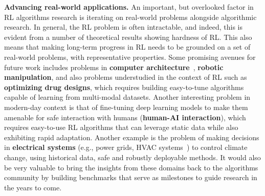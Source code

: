 \documentclass[../thesis.tex]{subfiles}
\begin{document}
{\textbf{Advancing real-world applications.}} An important, but overlooked factor in RL algorithms research is iterating on real-world problems alongside algorithmic research. In general, the RL problem is often intractable, and indeed, this is evident from a number of theoretical results showing hardness of RL. This also means that making long-term progress in RL needs to be grounded on a set of real-world problems, with representative properties. Some promising avenues for future work includes problems in \textbf{computer architecture}~\citep{fawzi2022discovering}, \textbf{robotic manipulation}, and also problems understudied in the context of RL such as \textbf{optimizing drug designs}, which requires building easy-to-tune algorithms capable of learning from multi-modal datasets. 
Another interesting problem in modern-day context is that of fine-tuning deep learning models to make them amenable for safe interaction with humans (\textbf{human-AI interaction}), which requires easy-to-use RL algorithms that can leverage static data while also exhibiting rapid adaptation. Another example is the problem of making decisions in \textbf{electrical systems} (e.g., power grids, HVAC systems~\citep{wong2022optimizing}) to control climate change, using historical data, safe and robustly deployable methods. It would also be very valuable to bring the insights from these domains back to the algorithms community by building benchmarks that serve as milestones to guide research in the years to come.  
\end{document}
